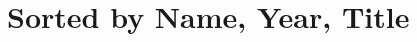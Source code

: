 \documentclass{article}
\begin{document}
\section*{Sorted by Name, Year, Title}

\nocite{*}

\printbibliography
\end{document}

